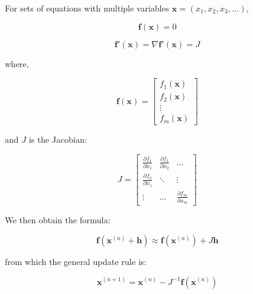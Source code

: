 \documentclass[12pt]{article}
\begin{document}
For sets of equations with multiple variables $\mathbf{x}=(x_1, x_2, x_3, ...)$,

\vspace{2mm}

$$\boldsymbol{f}(\boldsymbol{x}) = 0$$

$$\boldsymbol{f}'(\boldsymbol{x}) = \nabla \boldsymbol{f}'(\boldsymbol{x}) = J$$

\vspace{4mm}

where,

\[
\mathbf{f}(\mathbf{x}) =
\begin{bmatrix}
f_1(\mathbf{x}) \\[1ex]
f_2(\mathbf{x}) \\[1ex]
\vdots \\
f_m(\mathbf{x})
\end{bmatrix}
\]

and $J$ is the Jacobian:

\[
J =
\begin{bmatrix}
  \frac{\partial f_1}{\partial x_1} & 
    \frac{\partial f_1}{\partial x_2} & 
    \dots \\[1ex] %
  \frac{\partial f_2}{\partial x_1} & 
    \ddots & 
    \vdots \\[1ex]
  \vdots & 
    \dots & 
    \frac{\partial f_m}{\partial x_m}
\end{bmatrix}
\]

\vspace{4mm}

We then obtain the formula:

\vspace{2mm}

$$\mathbf{f}(\mathbf{x}^{(n)} + \mathbf{h}) \approx \mathbf{f}(\mathbf{x}^{(n)}) + J\mathbf{h}$$

\vspace{4mm}

from which the general update rule is:

\vspace{2mm}

$$ \mathbf{x}^{(n+1)} = \mathbf{x}^{(n)} - J^{-1} \mathbf{f}(\mathbf{x}^{(n)}) $$
\end{document}
